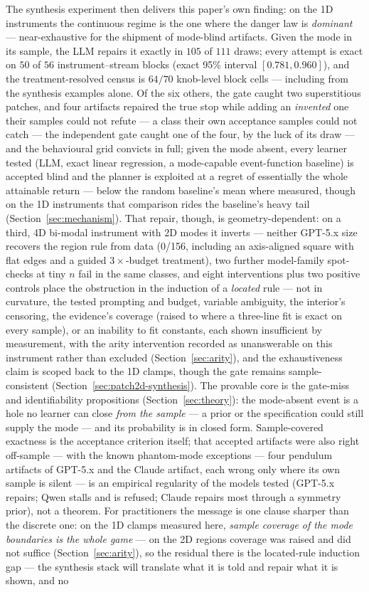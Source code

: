 \documentclass[11pt]{article}
\theoremstyle{definition}
\theoremstyle{remark}
\begin{document}
The synthesis experiment then delivers this paper's own finding: on the 1D instruments the continuous regime is the one where the danger law is \emph{dominant} --- near-exhaustive for the shipment of mode-blind artifacts. Given the mode in its sample, the LLM repairs it exactly in $105$ of $111$ draws; every attempt is exact on $50$ of $56$ instrument--stream blocks (exact 95\% interval $[0.781,0.960]$), and the treatment-resolved census is $64/70$ knob-level block cells --- including from the synthesis examples alone. Of the six others, the gate caught two superstitious patches, and four artifacts repaired the true stop while adding an \emph{invented} one their samples could not refute --- a class their own acceptance samples could not catch --- the independent gate caught one of the four, by the luck of its draw --- and the behavioural grid convicts in full; given the mode absent, every learner tested (LLM, exact linear regression, a mode-capable event-function baseline) is accepted blind and the planner is exploited at a regret of essentially the whole attainable return --- below the random baseline's mean where measured, though on the 1D instruments that comparison rides the baseline's heavy tail (Section~\ref{sec:mechanism}). That repair, though, is geometry-dependent: on a third, 4D bi-modal instrument with 2D modes it inverts --- neither GPT-5.x size recovers the region rule from data (0/156, including an axis-aligned square with flat edges and a guided $3\times$-budget treatment), two further model-family spot-checks at tiny $n$ fail in the same classes, and eight interventions plus two positive controls place the obstruction in the induction of a \emph{located} rule --- not in curvature, the tested prompting and budget, variable ambiguity, the interior's censoring, the evidence's coverage (raised to where a three-line fit is exact on every sample), or an inability to fit constants, each shown insufficient by measurement, with the arity intervention recorded as unanswerable on this instrument rather than excluded (Section~\ref{sec:arity}), and the exhaustiveness claim is scoped back to the 1D clamps, though the gate remains sample-consistent (Section~\ref{sec:patch2d-synthesis}). The provable core is the gate-miss and identifiability propositions (Section~\ref{sec:theory}): the mode-absent event is a hole no learner can close \emph{from the sample} --- a prior or the specification could still supply the mode --- and its probability is in closed form. Sample-covered exactness is the acceptance criterion itself; that accepted artifacts were also right off-sample --- with the known phantom-mode exceptions --- four pendulum artifacts of GPT-5.x and the Claude artifact, each wrong only where its own sample is silent --- is an empirical regularity of the models tested (GPT-5.x repairs; Qwen stalls and is refused; Claude repairs most through a symmetry prior), not a theorem. For practitioners the message is one clause sharper than the discrete one: on the 1D clamps measured here, \emph{sample coverage of the mode boundaries is the whole game} --- on the 2D regions coverage was raised and did not suffice (Section~\ref{sec:arity}), so the residual there is the located-rule induction gap --- the synthesis stack will translate what it is told and repair what it is shown, and no 
\end{document}
